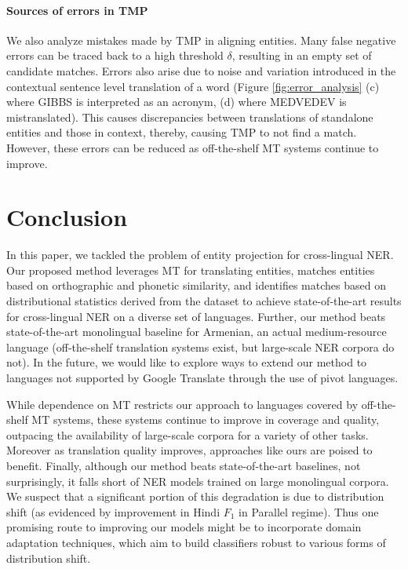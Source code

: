 \documentclass[11pt,a4paper]{article}
\begin{document}
\paragraph{Sources of errors in TMP}
We also analyze mistakes made by TMP in aligning entities. Many false negative errors can be traced back to a high threshold $\delta$, resulting in an empty set of candidate matches. Errors also arise due to noise and variation introduced in the contextual sentence level translation of a word (Figure \ref{fig:error_analysis} (c) where GIBBS is interpreted as an acronym, (d) where MEDVEDEV is mistranslated). This causes discrepancies between translations of standalone entities and those in context, thereby, causing TMP to not find a match. However, these errors can be reduced as off-the-shelf MT systems continue to improve.
%
 


%
 


\section{Conclusion}
In this paper, we tackled the problem of entity projection for cross-lingual NER. 
Our proposed method leverages MT for translating entities, 
matches entities based on orthographic and phonetic similarity,
and identifies matches based on distributional statistics derived from the dataset 
to achieve state-of-the-art results for cross-lingual NER on a diverse set of languages. 
Further, our method beats state-of-the-art monolingual baseline for Armenian,
an actual medium-resource language 
(off-the-shelf translation systems exist, but large-scale NER corpora do not). 
In the future, we would like to explore ways to extend our method 
to languages not supported by Google Translate through the use of pivot languages.

While dependence on MT restricts our approach to languages covered by off-the-shelf MT systems, 
these systems continue to improve in coverage and quality,
outpacing the availability of large-scale corpora for a variety of other tasks.
Moreover as translation quality improves, approaches like ours are poised to benefit.
Finally, although our method beats state-of-the-art baselines, 
not surprisingly, it falls short of NER models trained on large monolingual corpora. 
We suspect that a significant portion of this degradation is due to distribution shift 
(as evidenced by improvement in Hindi $F_1$ in Parallel regime). 
Thus one promising route to improving our models
might be to incorporate domain adaptation techniques, 
which aim to build classifiers robust to various forms of distribution shift.


 


\end{document}
